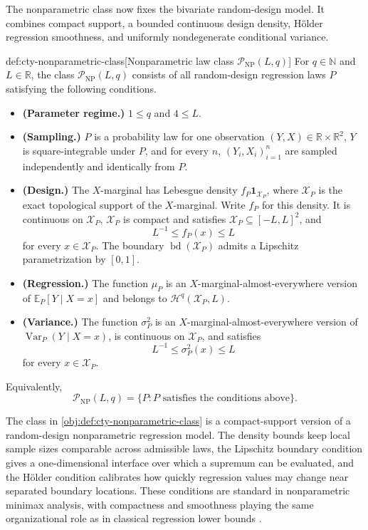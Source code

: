 The nonparametric class now fixes the bivariate random-design model. It combines compact support, a bounded continuous design density, Hölder regression smoothness, and uniformly nondegenerate conditional variance.

\begin{definitionv}{def:cty-nonparametric-class}[Nonparametric law class $\mathcal P_{\mathrm{NP}}(L,q)$]
For \(q\in\mathbb N\) and \(L\in\mathbb R\), the class \(\mathcal P_{\mathrm{NP}}(L,q)\) consists of all random-design regression laws \(P\) satisfying the following conditions.
\begin{itemize}
\item \textbf{(Parameter regime.)} \(1\leq q\) and \(4\leq L\).
\item \textbf{(Sampling.)} \(P\) is a probability law for one observation \((Y,X)\in\mathbb R\times\mathbb R^2\), \(Y\) is square-integrable under \(P\), and for every \(n\), \((Y_i,X_i)_{i=1}^n\) are sampled independently and identically from \(P\).
\item \textbf{(Design.)} The \(X\)-marginal has Lebesgue density \(f_P\mathbf 1_{\mathcal X_P}\), where \(\mathcal X_P\) is the exact topological support of the \(X\)-marginal. Write \(f_P\) for this density. It is continuous on \(\mathcal X_P\), \(\mathcal X_P\) is compact and satisfies \(\mathcal X_P\subseteq[-L,L]^2\), and
\[
L^{-1}\leq f_P(x)\leq L
\]
for every \(x\in\mathcal X_P\). The boundary \(\operatorname{bd}(\mathcal X_P)\) admits a Lipschitz parametrization by \([0,1]\).
\item \textbf{(Regression.)} The function \(\mu_P\) is an \(X\)-marginal-almost-everywhere version of \(\mathbb E_P[Y\mid X=x]\) and belongs to \(\mathcal H^q(\mathcal X_P,L)\).
\item \textbf{(Variance.)} The function \(\sigma_P^2\) is an \(X\)-marginal-almost-everywhere version of \(\operatorname{Var}_P(Y\mid X=x)\), is continuous on \(\mathcal X_P\), and satisfies
\[
L^{-1}\leq \sigma_P^2(x)\leq L
\]
for every \(x\in\mathcal X_P\).
\end{itemize}
Equivalently,
\[
\mathcal P_{\mathrm{NP}}(L,q)
=
\{P:\text{\(P\) satisfies the conditions above}\}.
\]
\end{definitionv}

The class in \cref{obj:def:cty-nonparametric-class} is a compact-support version of a random-design nonparametric regression model. The density bounds keep local sample sizes comparable across admissible laws, the Lipschitz boundary condition gives a one-dimensional interface over which a supremum can be evaluated, and the Hölder condition calibrates how quickly regression values may change near separated boundary locations. These conditions are standard in nonparametric minimax analysis, with compactness and smoothness playing the same organizational role as in classical regression lower bounds \citep{Stone1982,Tsybakov2009}.

